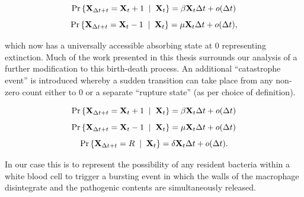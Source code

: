 $${\text{Pr}\left\{{\bf X}_{\Delta t + t}  = {{\bf X}_t} + 1 \;\; | \;\; {{\bf X}_t}\right\}} = \beta {{\bf X}_t} \Delta t + o(\Delta t)$$
$${\text{Pr}\left\{{\bf X}_{\Delta t + t}  = {{\bf X}_t} - 1 \;\; | \;\; {{\bf X}_t}\right\}} = \mu {{\bf X}_t} \Delta t + o(\Delta t),$$

\noindent
which now has a universally accessible absorbing state at 0 representing extinction. Much of the work presented in this thesis surrounds our analysis of a further modification to this birth-death process. An additional ``catastrophe event'' is introduced whereby a sudden transition can take place from any non-zero count either to 0 or a separate ``rupture state'' (as per choice of definition).

$${\text{Pr}\left\{{\bf X}_{\Delta t + t}  = {{\bf X}_t} + 1 \;\; | \;\; {{\bf X}_t}\right\}} = \beta {{\bf X}_t} \Delta t + o(\Delta t)$$
$${\text{Pr}\left\{{\bf X}_{\Delta t + t}  = {{\bf X}_t} - 1 \;\; | \;\; {{\bf X}_t}\right\}} = \mu {{\bf X}_t} \Delta t + o(\Delta t)$$
$${\text{Pr}\left\{{\bf X}_{\Delta t + t}  = R \;\; | \;\; {{\bf X}_t}\right\}} = \delta {{\bf X}_t} \Delta t + o(\Delta t).$$

\noindent
In our case this is to represent the possibility of any resident bacteria within a white blood cell to trigger a bursting event in which the walls of the macrophage disintegrate and the pathogenic contents are simultaneously released.
